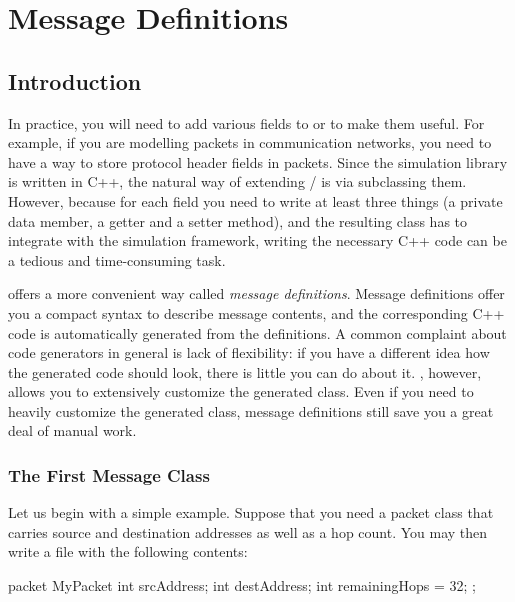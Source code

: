 \chapter{Message Definitions}
\label{cha:msg-def}

\section{Introduction}
\label{sec:msg-defs:intro}

In practice, you will need to add various fields to  or
 to make them useful. For example, if you are modelling
packets in communication networks, you need to have a way to store protocol
header fields in packets. Since the simulation library is written in C++,
the natural way of extending / is via
subclassing them. However, because for each field you need to write at
least three things (a private data member, a getter and a setter method),
and the resulting class has to integrate with the simulation framework,
writing the necessary C++ code can be a tedious and time-consuming task.

{\opp} offers a more convenient way called \textit{message definitions}.
Message definitions offer you a compact syntax to describe message
contents, and the corresponding C++ code is automatically generated from
the definitions. A common complaint about code generators in general is
lack of flexibility: if you have a different idea how the generated code
should look, there is little you can do about it. {\opp}, however, allows
you to extensively customize the generated class. Even if you need to
heavily customize the generated class, message definitions still save you a
great deal of manual work.


\subsection{The First Message Class}
\label{sec:msg-defs:first-msg-class}

Let us begin with a simple example. Suppose that you need a packet class that
carries source and destination addresses as well as a hop count. You may then
write a  file with the following contents:

\begin{msg}
packet MyPacket
{
     int srcAddress;
     int destAddress;
     int remainingHops = 32;
};
\end{msg}


